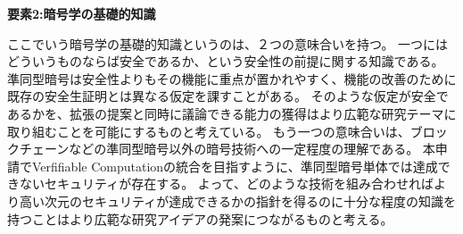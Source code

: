 \noindent\textbf{要素2:暗号学の基礎的知識}

ここでいう暗号学の基礎的知識というのは、２つの意味合いを持つ。
一つにはどういうものならば安全であるか、という安全性の前提に関する知識である。
準同型暗号は安全性よりもその機能に重点が置かれやすく、機能の改善のために既存の安全生証明とは異なる仮定を課すことがある。
そのような仮定が安全であるかを、拡張の提案と同時に議論できる能力の獲得はより広範な研究テーマに取り組むことを可能にするものと考えている。
もう一つの意味合いは、ブロックチェーンなどの準同型暗号以外の暗号技術への一定程度の理解である。
本申請でVerfifiable Computationの統合を目指すように、準同型暗号単体では達成できないセキュリティが存在する。
よって、どのような技術を組み合わせればより高い次元のセキュリティが達成できるかの指針を得るのに十分な程度の知識を持つことはより広範な研究アイデアの発案につながるものと考える。




